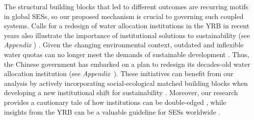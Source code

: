 The structural building blocks that led to different outcomes are recurring motifs in global SESs, so our proposed mechanism is crucial to governing such coupled systems.
Calls for a redesign of water allocation institutions in the YRB in recent years also illustrate the importance of institutional solutions to sustainability (see \textit{Appendix }) \cite{yu2019}.
Given the changing environmental context, outdated and inflexible water quotas can no longer meet the demands of sustainable development \cite{wang2019a}.
Thus, the Chinese government has embarked on a plan to redesign its decades-old water allocation institution (see \textit{Appendix~}).
These initiatives can benefit from our analysis by actively incorporating social-ecological matched building blocks when developing a new institutional shift for sustainability \cite{bodin2017b}.
Moreover, our research provides a cautionary tale of how institutions can be double-edged \cite{hegwood2022}, while insights from the YRB can be a valuable guideline for SESs worldwide \cite{muneepeerakul2017, leslie2015}.
